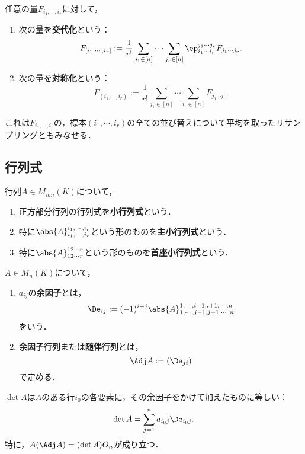 \documentclass[uplatex, dvipdfmx]{jsreport}
\begin{document}
\begin{definition}
    任意の量$F_{i_1,\cdots,i_r}$に対して，
    \begin{enumerate}
        \item 次の量を\textbf{交代化}という：
        \[F_{[i_1,\cdots,i_r]}:=\frac{1}{r!}\sum_{j_1\in[n]}\cdots\sum_{j_r\in[n]}\ep^{j_1\cdots j_r}_{i_1\cdots i_r}F_{j_1\cdots j_r}.\]
        \item 次の量を\textbf{対称化}という：
        \[F_{(i_1,\cdots,i_r)}:=\frac{1}{r!}\sum_{j_1\in[n]}\cdots\sum_{i_r\in[n]}F_{j_1\cdots j_r}.\]
    \end{enumerate}
\end{definition}
\begin{remarks}
    これは$F_{i_1,\cdots,i_r}$の，標本$(i_1,\cdots,i_r)$の全ての並び替えについて平均を取ったリサンプリングともみなせる．
\end{remarks}

\subsection{行列式}

\begin{definition}
    行列$A\in M_{mn}(K)$について，
    \begin{enumerate}
        \item 正方部分行列の行列式を\textbf{小行列式}という．
        \item 特に$\abs{A}^{i_1,\cdots,i_r}_{i_1,\cdots,i_r}$という形のものを\textbf{主小行列式}という．
        \item 特に$\abs{A}^{12\cdots r}_{12\cdots r}$という形のものを\textbf{首座小行列式}という．
    \end{enumerate}
\end{definition}

\begin{definition}
    $A\in M_n(K)$について，
    \begin{enumerate}
        \item $a_{ij}$の\textbf{余因子}とは，
        \[\De_{ij}:=(-1)^{i+j}\abs{A}^{1,\cdots,i-1,i+1,\cdots,n}_{1,\cdots,j-1,j+1,\cdots, n}\]
        をいう．
        \item \textbf{余因子行列}または\textbf{随伴行列}とは，
        \[\Adj A:=(\De_{ji})\]
        で定める．
    \end{enumerate}
\end{definition}

\begin{proposition}
    $\det A$は$A$のある行$i_0$の各要素に，その余因子をかけて加えたものに等しい：
    \[\det A=\sum_{j=1}^na_{i_0j}\De_{i_0j}.\]
    特に，$A(\Adj A)=(\det A)O_n$が成り立つ．
\end{proposition}
\end{document}
